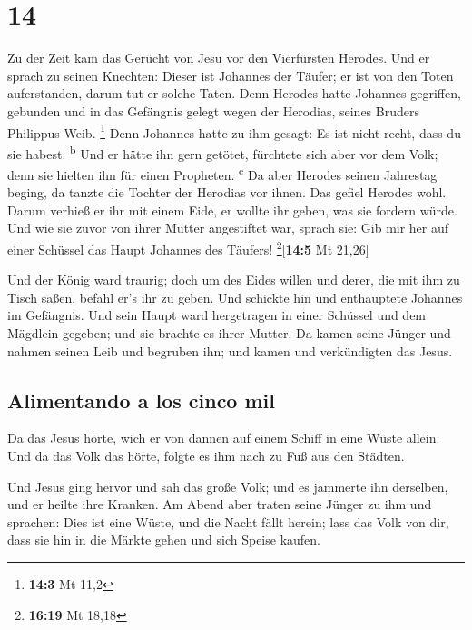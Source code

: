 \hypertarget{section-13}{%
\section{14}\label{section-13}}

 Zu der Zeit kam das Gerücht von Jesu vor den Vierfürsten
Herodes.  Und er sprach zu seinen Knechten: Dieser ist
Johannes der Täufer; er ist von den Toten auferstanden, darum tut er
solche Taten.  Denn Herodes hatte Johannes gegriffen,
gebunden und in das Gefängnis gelegt wegen der Herodias, seines Bruders
Philippus Weib. \footnote{\textbf{14:3} Mt 11,2}  Denn
Johannes hatte zu ihm gesagt: Es ist nicht recht, dass du sie habest.
\textsuperscript{b}  Und er hätte ihn gern getötet,
fürchtete sich aber vor dem Volk; denn sie hielten ihn für einen
Propheten. \textsuperscript{c}  Da aber Herodes seinen
Jahrestag beging, da tanzte die Tochter der Herodias vor ihnen. Das
gefiel Herodes wohl.  Darum verhieß er ihr mit einem Eide,
er wollte ihr geben, was sie fordern würde.  Und wie sie
zuvor von ihrer Mutter angestiftet war, sprach sie: Gib mir her auf
einer Schüssel das Haupt Johannes des Täufers!
\footnote{\textbf{16:19} Mt 18,18}{[}\textbf{14:5} Mt 21,26{]}

 Und der König ward traurig; doch um des Eides willen und
derer, die mit ihm zu Tisch saßen, befahl er's ihr zu geben.
 Und schickte hin und enthauptete Johannes im Gefängnis.
 Und sein Haupt ward hergetragen in einer Schüssel und
dem Mägdlein gegeben; und sie brachte es ihrer Mutter. 
Da kamen seine Jünger und nahmen seinen Leib und begruben ihn; und kamen
und verkündigten das Jesus.

\hypertarget{alimentando-a-los-cinco-mil}{%
\subsection{Alimentando a los cinco
mil}\label{alimentando-a-los-cinco-mil}}

 Da das Jesus hörte, wich er von dannen auf einem Schiff
in eine Wüste allein. Und da das Volk das hörte, folgte es ihm nach zu
Fuß aus den Städten.

 Und Jesus ging hervor und sah das große Volk; und es
jammerte ihn derselben, und er heilte ihre Kranken.  Am
Abend aber traten seine Jünger zu ihm und sprachen: Dies ist eine Wüste,
und die Nacht fällt herein; lass das Volk von dir, dass sie hin in die
Märkte gehen und sich Speise kaufen.

